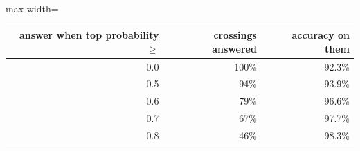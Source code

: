 \begin{adjustbox}{max width=\textwidth}
{\footnotesize
\begin{tabular}{rrr}
\toprule
\textbf{answer when top probability $\geq$} & \textbf{crossings answered} & \textbf{accuracy on them} \\
\midrule
0.0 & 100\% & 92.3\% \\
0.5 & 94\% & 93.9\% \\
0.6 & 79\% & 96.6\% \\
0.7 & 67\% & 97.7\% \\
0.8 & 46\% & 98.3\% \\
\bottomrule
\end{tabular}
}
\end{adjustbox}

